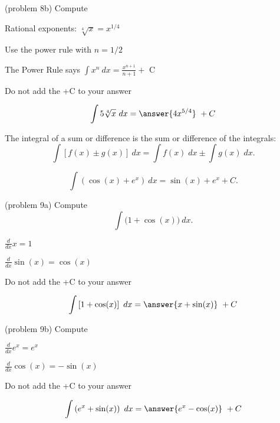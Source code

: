 \documentclass[handout]{ximera}
\begin{document}
\begin{problem}(problem 8b)
Compute 


\begin{hint}
Rational exponents: $\sqrt[4]x = x^{1/4}$
\end{hint}
\begin{hint}
Use the power rule with $n=1/2$
\end{hint}
\begin{hint}
The Power Rule says $\int x^n \ dx = \frac{x^{n+1}}{n+1} +$ C
\end{hint}
\begin{hint}
\begin{center}
Do not add the +C to your answer
\end{center}
\end{hint}

\[
\int 5\sqrt[4]x \ dx =
\answer{4x^{5/4}} \ + C
\]
\end{problem}



\begin{theorem}
The integral of a sum or difference is the sum or difference of the integrals:
\[
\int \left[f(x)\pm g(x)\right] \ dx = \int f(x) \; dx  \pm  \int g(x) \; dx.
\]
\end{theorem}



\begin{example}[example 9]
\[
\int \left(\cos(x) + e^x\right) \ dx = \sin(x) + e^x + C.
\]
\end{example}

\begin{problem}(problem 9a)
Compute
\[
\int \big(1 + \cos(x) \big) \ dx.
\]

\begin{hint}
$\frac{d}{dx} x = 1$
\end{hint}
\begin{hint}
$\frac{d}{dx} \sin(x) = \cos(x)$
\end{hint}
\begin{hint}
\begin{center}
Do not add the +C to your answer
\end{center}
\end{hint}

\[
\int \left[1 + \cos(x) \right] \ dx =
\answer{x + \sin(x)} \ +  C
\]
\end{problem}


\begin{problem}(problem 9b)
Compute

\begin{hint}
$\frac{d}{dx} e^x = e^x$
\end{hint}
\begin{hint}
$\frac{d}{dx} \cos(x) = -\sin(x)$
\end{hint}
\begin{hint}
\begin{center}
Do not add the +C to your answer
\end{center}
\end{hint}

\[
\int \left(e^x + \sin(x) \right) \ dx =
\answer{e^x -\cos(x)} \ +  C
\]
\end{problem}
\end{document}

